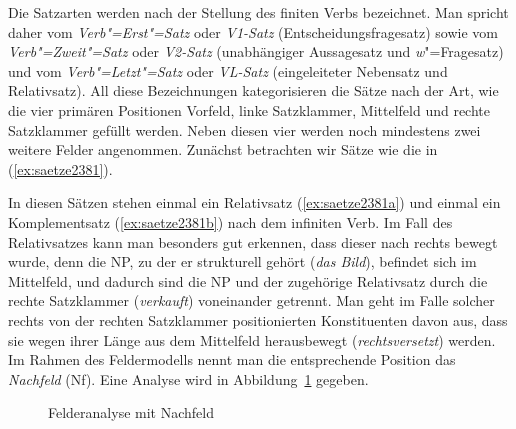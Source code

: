 
Die Satzarten werden nach der Stellung des finiten Verbs bezeichnet.
Man spricht daher vom \textit{Verb"=Erst"=Satz} oder \textit{V1-Satz} (Entscheidungsfragesatz) sowie vom \textit{Verb"=Zweit"=Satz} oder \textit{V2-Satz} (unabhängiger Aussagesatz und \textit{w}"=Fragesatz) und vom \textit{Verb"=Letzt"=Satz} oder \textit{VL-Satz} (eingeleiteter Nebensatz und Relativsatz).
All diese Bezeichnungen kategorisieren die Sätze nach der Art, wie die vier primären Positionen Vorfeld, linke Satzklammer, Mittelfeld und rechte Satzklammer gefüllt werden.
Neben diesen vier werden noch mindestens zwei weitere Felder angenommen.
Zunächst betrachten wir Sätze wie die in (\ref{ex:saetze2381}).


\begin{exe}
  \ex\label{ex:saetze2381}
  \begin{xlist}
  \end{xlist}
\end{exe}


In diesen Sätzen stehen einmal ein Relativsatz (\ref{ex:saetze2381a}) und einmal ein Komplementsatz (\ref{ex:saetze2381b}) nach dem infiniten Verb.
Im Fall des Relativsatzes kann man besonders gut erkennen, dass dieser nach rechts bewegt wurde, denn die NP, zu der er strukturell gehört (\textit{das Bild}), befindet sich im Mittelfeld, und dadurch sind die NP und der zugehörige Relativsatz durch die rechte Satzklammer (\textit{verkauft}) voneinander getrennt.
Man geht im Falle solcher rechts von der rechten Satzklammer positionierten Konstituenten davon aus, dass sie wegen ihrer Länge aus dem Mittelfeld herausbewegt (\textit{rechtsversetzt}) werden.
Im Rahmen des Feldermodells nennt man die entsprechende Position das \textit{Nachfeld} (Nf).
Eine Analyse wird in Abbildung~\ref{fig:nachfeld} gegeben.


\begin{figure}[!htbp]
  \centering
  \caption{Felderanalyse mit Nachfeld}
  \label{fig:nachfeld}
\end{figure}

